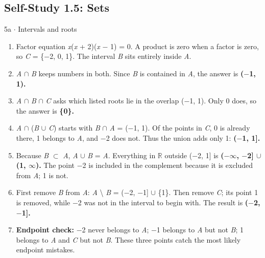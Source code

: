 \documentclass[11pt]{article}
\begin{document}
\begin{keepsection}\subsection{Self-Study 1.5: Sets}

\begin{workedbox}{5a \ensuremath{\cdot} Intervals and roots}
\begin{enumerate}
\item Factor equation \textit{x}(\textit{x} + 2)(\textit{x} \ensuremath{-} 1) = 0. A product is zero when a factor is zero, so \textit{C} = \{\ensuremath{-}2, 0, 1\}. The interval \textit{B} sits entirely inside \textit{A}.
\item \textit{A} \ensuremath{\cap} \textit{B} keeps numbers in both. Since \textit{B} is contained in \textit{A}, the answer is \textbf{(\ensuremath{-}1, 1).}
\item \textit{A} \ensuremath{\cap} \textit{B} \ensuremath{\cap} \textit{C} asks which listed roots lie in the overlap (\ensuremath{-}1, 1). Only 0 does, so the answer is \textbf{\{0\}.}
\item \textit{A} \ensuremath{\cap} (\textit{B} \ensuremath{\cup} \textit{C}) starts with \textit{B} \ensuremath{\cap} \textit{A} = (\ensuremath{-}1, 1). Of the points in \textit{C}, 0 is already there, 1 belongs to \textit{A}, and \ensuremath{-}2 does not. Thus the union adds only 1: \textbf{(\ensuremath{-}1, 1].}
\item Because \textit{B} \ensuremath{\subset} \textit{A}, \textit{A} \ensuremath{\cup} \textit{B} = \textit{A}. Everything in \ensuremath{\mathbb{R}} outside (\ensuremath{-}2, 1] is \textbf{(\ensuremath{-}\ensuremath{\infty}, \ensuremath{-}2] \ensuremath{\cup} (1, \ensuremath{\infty}).} The point \ensuremath{-}2 is included in the complement because it is excluded from \textit{A}; 1 is not.
\item First remove \textit{B} from \textit{A}: \textit{A} \textbackslash{} \textit{B} = (\ensuremath{-}2, \ensuremath{-}1] \ensuremath{\cup} \{1\}. Then remove \textit{C}; its point 1 is removed, while \ensuremath{-}2 was not in the interval to begin with. The result is \textbf{(\ensuremath{-}2, \ensuremath{-}1].}
\item \textbf{Endpoint check:} \ensuremath{-}2 never belongs to \textit{A}; \ensuremath{-}1 belongs to \textit{A} but not \textit{B}; 1 belongs to \textit{A} and \textit{C} but not \textit{B}. These three points catch the most likely endpoint mistakes.
\end{enumerate}
\end{workedbox}

\end{keepsection}
\end{document}
